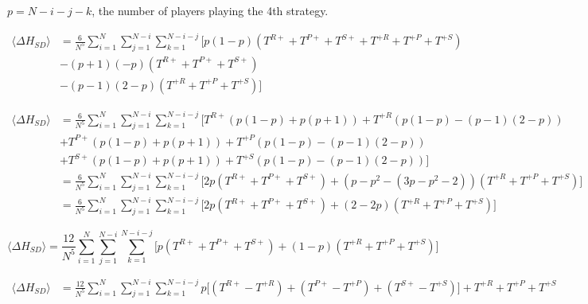 \documentclass[./main.tex]{subfiles}
\begin{document}
$p = N - i - j - k$, the number of players playing the 4th strategy.


\begin{equation} \nonumber
\begin{aligned}
  \langle \Delta H_{SD} \rangle &= \frac{6}{N^5} \sum_{i=1}^{N}\sum_{j=1}^{N-i}\sum_{k=1}^{N-i-j}\Big[p(1-p)(T^{R+} + T^{P+} + T^{S+}+ T^{+R}+ T^{+P} +T^{+S}) \\
  &- (p + 1)(-p)(T^{R+} + T^{P+} + T^{S+}) \\
  &- (p-1)(2 -p)(T^{+R} + T^{+P} + T^{+S})\Big]
\end{aligned}
\end{equation}


\begin{equation} \nonumber
\begin{aligned}
\langle \Delta H_{SD} \rangle &= \frac{6}{N^5} \sum_{i=1}^{N}\sum_{j=1}^{N-i}\sum_{k=1}^{N-i-j} 
\Big[T^{R+}\left(p(1-p) + p(p+1)\right) + T^{+R}\left(p(1-p) - (p-1)(2-p)\right) \\
&+ T^{P+}\left(p(1-p) + p(p+1)\right) + T^{+P}\left(p(1-p) - (p-1)(2-p)\right) \\
&+ T^{S+}\left(p(1-p) + p(p+1)\right) + T^{+S}\left(p(1-p) - (p-1)(2-p)\right) 
\Big] \\
&= \frac{6}{N^5} \sum_{i=1}^{N}\sum_{j=1}^{N-i}\sum_{k=1}^{N-i-j} \Big[
2p\left(T^{R+} + T^{P+} + T^{S+}\right) + (p - p^2 - (3p - p^2 -2))(T^{+R} + T^{+P} + T^{+S})
\Big] \\
&= \frac{6}{N^5} \sum_{i=1}^{N}\sum_{j=1}^{N-i}\sum_{k=1}^{N-i-j}\Big[
2p\left(T^{R+} + T^{P+} + T^{S+}\right) + (2 - 2p)(T^{+R} + T^{+P} + T^{+S})
\Big] 
\end{aligned}
\end{equation}


\begin{equation} \nonumber
\langle \Delta H_{SD} \rangle = \frac{12}{N^5} \sum_{i=1}^{N}\sum_{j=1}^{N-i}\sum_{k=1}^{N-i-j} \Big[
p\left(T^{R+} + T^{P+} + T^{S+}\right) + (1 - p)(T^{+R} + T^{+P} + T^{+S})
\Big]
\end{equation}

\begin{equation}
\begin{aligned}
\langle \Delta H_{SD} \rangle &= \frac{12}{N^5} \sum_{i=1}^{N}\sum_{j=1}^{N-i}\sum_{k=1}^{N-i-j}
p\Big[ (T^{R+} - T^{+R}) + (T^{P+} - T^{+P}) +(T^{S+} - T^{+S}) \Big]+ T^{+R} + T^{+P} + T^{+S}
\end{aligned}
\end{equation}
\end{document}
